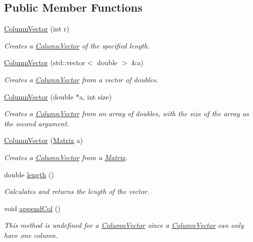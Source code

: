 \subsection*{Public Member Functions}
\begin{DoxyCompactItemize}
\item 
\hyperlink{class_column_vector_a080508988b684290b2a0123a923a1e08}{ColumnVector} (int r)
\begin{DoxyCompactList}\small\item\em Creates a \hyperlink{class_column_vector}{ColumnVector} of the specified length. \item\end{DoxyCompactList}\item 
\hyperlink{class_column_vector_a51a68a454f01918fd4bc1736ac0d4264}{ColumnVector} (std::vector$<$ double $>$ \&a)
\begin{DoxyCompactList}\small\item\em Creates a \hyperlink{class_column_vector}{ColumnVector} from a vector of doubles. \item\end{DoxyCompactList}\item 
\hyperlink{class_column_vector_aa0b9560305d34dd819e7913a811f3336}{ColumnVector} (double $\ast$a, int size)
\begin{DoxyCompactList}\small\item\em Creates a \hyperlink{class_column_vector}{ColumnVector} from an array of doubles, with the size of the array as the second argument. \item\end{DoxyCompactList}\item 
\hyperlink{class_column_vector_a3fae5c07b5b805aa05da3c9952838892}{ColumnVector} (\hyperlink{class_matrix}{Matrix} a)
\begin{DoxyCompactList}\small\item\em Creates a \hyperlink{class_column_vector}{ColumnVector} from a \hyperlink{class_matrix}{Matrix}. \item\end{DoxyCompactList}\item 
double \hyperlink{class_column_vector_a66329a870ee70b5cd93879d3be247b21}{length} ()
\begin{DoxyCompactList}\small\item\em Calculates and returns the length of the vector. \item\end{DoxyCompactList}\item 
void \hyperlink{class_column_vector_a0e67b7831d9d4c02691056a72abc6975}{appendCol} ()
\begin{DoxyCompactList}\small\item\em This method is undefined for a \hyperlink{class_column_vector}{ColumnVector} since a \hyperlink{class_column_vector}{ColumnVector} can only have one column. \item\end{DoxyCompactList}\end{DoxyCompactItemize}


